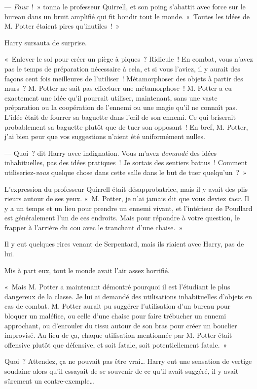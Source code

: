 --- \emph{Faux}~!~» tonna le professeur Quirrell, et son poing s'abattit avec force sur le bureau dans un bruit amplifié qui fit bondir tout le monde. «~Toutes les idées de M. Potter étaient pires qu'inutiles~!~»

Harry sursauta de surprise.

«~Enlever le sol pour créer un piège à piques~? Ridicule~! En combat, vous n'avez pas le temps de préparation nécessaire à cela, et si vous l'aviez, il y aurait des façons cent fois meilleures de l'utiliser~! Métamorphoser des objets à partir des murs~? M. Potter ne sait pas effectuer une métamorphose~! M. Potter a eu exactement une idée qu'il pourrait utiliser, maintenant, sans une vaste préparation ou la coopération de l'ennemi ou une magie qu'il ne connaît pas. L'idée était de fourrer sa baguette dans l'œil de son ennemi. Ce qui briserait probablement sa baguette plutôt que de tuer son opposant~! En bref, M. Potter, j'ai bien peur que vos suggestions n'aient été uniformément nulles.

--- Quoi~? dit Harry avec indignation. Vous m'avez \emph{demandé} des idées inhabituelles, pas des idées pratiques~! Je sortais des sentiers battus~! Comment utiliseriez-\emph{vous} quelque chose dans cette salle dans le but de tuer quelqu'un~?~»

L'expression du professeur Quirrell était désapprobatrice, mais il y avait des plis rieurs autour de ses yeux. «~M. Potter, je n'ai jamais dit que vous deviez \emph{tuer}. Il y a un temps et un lieu pour prendre un ennemi vivant, et l'intérieur de Poudlard est généralement l'un de ces endroits. Mais pour répondre à votre question, le frapper à l'arrière du cou avec le tranchant d'une chaise.~»

Il y eut quelques rires venant de Serpentard, mais ils riaient avec Harry, pas de lui.

Mis à part eux, tout le monde avait l'air assez horrifié.

«~Mais M. Potter a maintenant démontré pourquoi il est l'étudiant le plus dangereux de la classe. Je lui ai demandé des utilisations inhabituelles d'objets en cas de combat. M. Potter aurait pu suggérer l'utilisation d'un bureau pour bloquer un maléfice, ou celle d'une chaise pour faire trébucher un ennemi approchant, ou d'enrouler du tissu autour de son bras pour créer un bouclier improvisé. Au lieu de ça, chaque utilisation mentionnée par M. Potter était offensive plutôt que défensive, et soit fatale, soit potentiellement fatale.~»

Quoi~? Attendez, ça ne pouvait pas être vrai… Harry eut une sensation de vertige soudaine alors qu'il essayait de se souvenir de ce qu'il avait suggéré, il y avait sûrement un contre-exemple…

